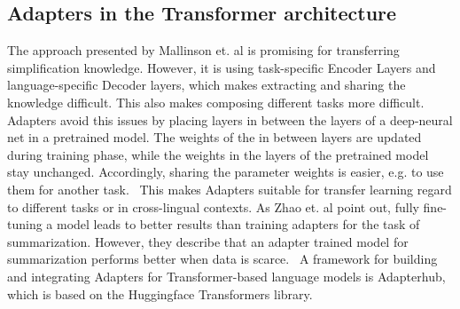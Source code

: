 \subsection{Adapters in the Transformer architecture}
The approach presented by Mallinson et. al is promising for transferring simplification knowledge. However, it is using task-specific
Encoder Layers and language-specific Decoder layers, which makes extracting and sharing the knowledge difficult.
This also makes composing different tasks more difficult.~\cite{Pfeiffer2020}
Adapters avoid this issues by placing layers in between the layers of a deep-neural net in a pretrained model.
The weights of the in between layers are updated during training phase, while the weights in the layers of the pretrained model stay unchanged.
Accordingly, sharing the parameter weights is easier, e.g. to use them for another task.~\cite{Houlsby2019}
This makes Adapters suitable for transfer learning regard to different tasks or in cross-lingual contexts.
As Zhao et. al point out, fully fine-tuning a model leads to better results than training adapters for the task of summarization.
However, they describe that an adapter trained model for summarization performs better when data is scarce.~\cite{Zhao2022}
A framework for building and integrating Adapters for Transformer-based language models is Adapterhub, which is based on
the Huggingface Transformers library.~\cite{Pfeiffer2023, Huggingface2023}

